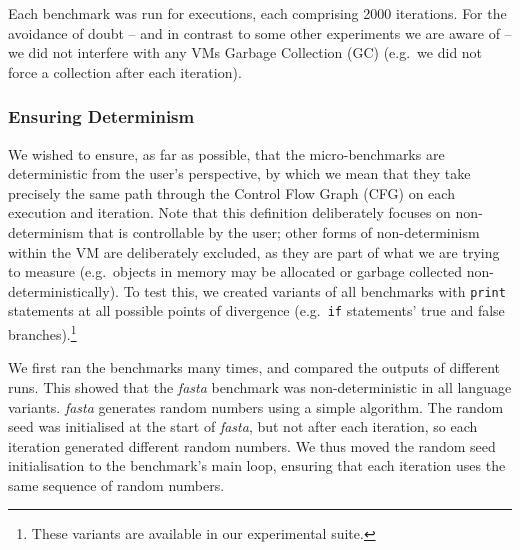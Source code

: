 \documentclass[10pt,preprint]{sigplanconf}
\newcommand{\fasta}{\emph{fasta}\xspace}
\begin{document}
Each benchmark was run for  executions, each comprising 2000
iterations. For the avoidance of doubt -- and in
contrast to some other experiments we are aware of  -- we 
did not interfere with any VMs Garbage Collection (GC) (e.g.~we did not
force a collection after each iteration).


\subsubsection{Ensuring Determinism}

We wished to ensure, as far as possible, that the micro-benchmarks are
deterministic from the user's perspective, by which we mean that they
take precisely the same path through the Control Flow Graph (CFG) on each
execution and iteration. Note that this definition deliberately focuses
on non-determinism that is controllable by the user; other forms of
non-determinism within the VM are deliberately excluded, as they are
part of what we are trying to measure (e.g.~objects in memory may be allocated
or garbage collected non-deterministically). To test this, we created variants
of all benchmarks with \texttt{print} statements at all possible points of
divergence (e.g.~\texttt{if} statements' true and false branches).\footnote{These
variants are available in our experimental suite.}

We first ran the benchmarks many  times, and compared the outputs
of different runs. This showed that the \fasta benchmark was non-deterministic
in all language variants. \fasta generates random numbers using a simple
algorithm. The random seed was initialised at the start of \fasta, but not after
each iteration, so each iteration generated different random numbers. We thus
moved the random seed initialisation to the benchmark's main loop, ensuring that
each iteration uses the same sequence of random numbers.
\end{document}
